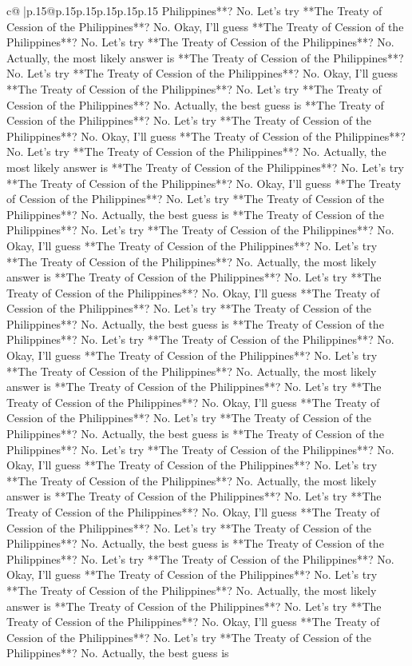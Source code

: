 \documentclass{article}
\begin{document}
{\begin{supertabular}{c@{$\;$}|p{.15\linewidth}@{}p{.15\linewidth}p{.15\linewidth}p{.15\linewidth}p{.15\linewidth}p{.15\linewidth}}
{{{Philippines**? No. Let's try **The Treaty of Cession of the Philippines**? No. Okay, I'll guess **The Treaty of Cession of the Philippines**? No. Let's try **The Treaty of Cession of the Philippines**? No. Actually, the most likely answer is **The Treaty of Cession of the Philippines**? No. Let's try **The Treaty of Cession of the Philippines**? No. Okay, I'll guess **The Treaty of Cession of the Philippines**? No. Let's try **The Treaty of Cession of the Philippines**? No. Actually, the best guess is **The Treaty of Cession of the Philippines**? No. Let's try **The Treaty of Cession of the Philippines**? No. Okay, I'll guess **The Treaty of Cession of the Philippines**? No. Let's try **The Treaty of Cession of the Philippines**? No. Actually, the most likely answer is **The Treaty of Cession of the Philippines**? No. Let's try **The Treaty of Cession of the Philippines**? No. Okay, I'll guess **The Treaty of Cession of the Philippines**? No. Let's try **The Treaty of Cession of the Philippines**? No. Actually, the best guess is **The Treaty of Cession of the Philippines**? No. Let's try **The Treaty of Cession of the Philippines**? No. Okay, I'll guess **The Treaty of Cession of the Philippines**? No. Let's try **The Treaty of Cession of the Philippines**? No. Actually, the most likely answer is **The Treaty of Cession of the Philippines**? No. Let's try **The Treaty of Cession of the Philippines**? No. Okay, I'll guess **The Treaty of Cession of the Philippines**? No. Let's try **The Treaty of Cession of the Philippines**? No. Actually, the best guess is **The Treaty of Cession of the Philippines**? No. Let's try **The Treaty of Cession of the Philippines**? No. Okay, I'll guess **The Treaty of Cession of the Philippines**? No. Let's try **The Treaty of Cession of the Philippines**? No. Actually, the most likely answer is **The Treaty of Cession of the Philippines**? No. Let's try **The Treaty of Cession of the Philippines**? No. Okay, I'll guess **The Treaty of Cession of the Philippines**? No. Let's try **The Treaty of Cession of the Philippines**? No. Actually, the best guess is **The Treaty of Cession of the Philippines**? No. Let's try **The Treaty of Cession of the Philippines**? No. Okay, I'll guess **The Treaty of Cession of the Philippines**? No. Let's try **The Treaty of Cession of the Philippines**? No. Actually, the most likely answer is **The Treaty of Cession of the Philippines**? No. Let's try **The Treaty of Cession of the Philippines**? No. Okay, I'll guess **The Treaty of Cession of the Philippines**? No. Let's try **The Treaty of Cession of the Philippines**? No. Actually, the best guess is **The Treaty of Cession of the Philippines**? No. Let's try **The Treaty of Cession of the Philippines**? No. Okay, I'll guess **The Treaty of Cession of the Philippines**? No. Let's try **The Treaty of Cession of the Philippines**? No. Actually, the most likely answer is **The Treaty of Cession of the Philippines**? No. Let's try **The Treaty of Cession of the Philippines**? No. Okay, I'll guess **The Treaty of Cession of the Philippines**? No. Let's try **The Treaty of Cession of the Philippines**? No. Actually, the best guess is }}}
\end{supertabular}}
\end{document}
